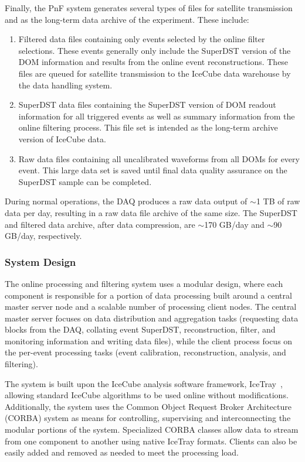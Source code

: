 Finally, the PnF system generates several types of files for satellite
transmission and as the long-term data archive of the experiment. These
include:   
\begin{enumerate}
\item Filtered data files containing only events selected by the online filter
  selections.  These events generally only include the SuperDST version of
  the DOM information and results from the online event reconstructions.
  These files are queued for satellite transmission to the IceCube data
  warehouse by the data handling system.
\item SuperDST data files containing the SuperDST version of DOM readout
  information for all triggered events as well as summary information from
  the online filtering process.  This file set is intended as the long-term
  archive version of IceCube data.
\item Raw data files containing all uncalibrated waveforms from all DOMs for
  every event.  This large data set is saved until final data quality
  assurance on the SuperDST sample can be completed.
\end{enumerate}

During normal operations, the DAQ produces a raw data output of $\sim$1 TB
of raw data per day, resulting in a raw data file 
archive of the same size.  The SuperDST and filtered data archive, after
data compression, are $\sim$170 GB/day and $\sim$90 GB/day, respectively.

\subsubsection{System Design}

The online processing and filtering system uses a modular design, where
each component is responsible for a portion of data processing built around
a central master server node and a scalable number of processing client
nodes.  The central master server focuses on data distribution and
aggregation tasks (requesting data blocks from the DAQ, collating event
SuperDST, reconstruction, filter, and monitoring information and writing
data files), while the client process focus on the per-event processing
tasks (event calibration, reconstruction, analysis, and filtering).

The system is built upon the IceCube analysis software framework,
IceTray~\cite{DeYoung:2005zz}, allowing standard IceCube algorithms to be
used online without modifications.
Additionally, the system uses the Common Object Request Broker Architecture
(CORBA) system as means for controlling, supervising and interconnecting
the modular portions of the system.  Specialized CORBA classes allow
data to stream from one component to another using native IceTray formats.
Clients can also be easily added and removed as needed to meet the
processing load.

